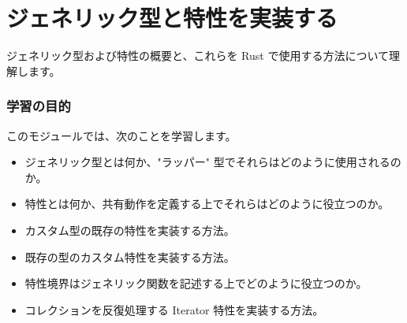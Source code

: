 \section{ジェネリック型と特性を実装する}

ジェネリック型および特性の概要と、これらを Rust で使用する方法について理解します。

\subsubsection{学習の目的}

このモジュールでは、次のことを学習します。

\begin{itemize}
\item ジェネリック型とは何か、"ラッパー" 型でそれらはどのように使用されるのか。
\item 特性とは何か、共有動作を定義する上でそれらはどのように役立つのか。
\item カスタム型の既存の特性を実装する方法。
\item 既存の型のカスタム特性を実装する方法。
\item 特性境界はジェネリック関数を記述する上でどのように役立つのか。
\item コレクションを反復処理する Iterator 特性を実装する方法。
\end{itemize}